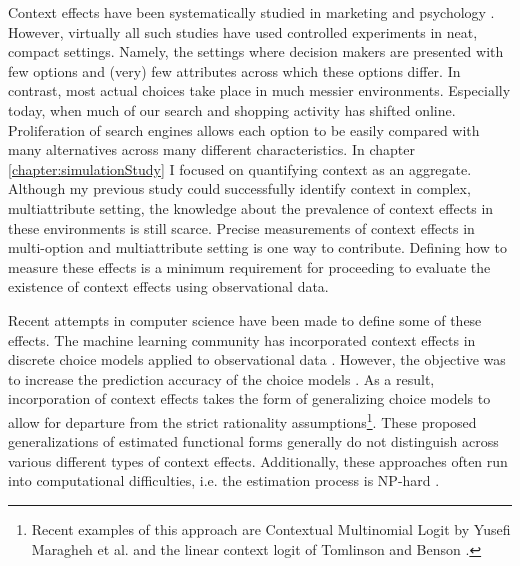 \documentclass[a4paper,12pt]{article}
\newcommand{\citeyearonly}[1]{\citeyearpar{#1}}
\begin{document}
Context effects have been systematically studied in marketing and psychology \citep{kivetz04, roodrkerkEtAl11, frederickEtAl14, dotsonEtAl18}. However, virtually all such studies have used controlled experiments in neat, compact settings. Namely, the settings where decision makers are presented with few options and (very) few attributes across which these options differ. In contrast, most actual choices take place in much messier environments. Especially today, when much of our search and shopping activity has shifted online. Proliferation of search engines allows each option to be easily compared with many alternatives across many different characteristics. In chapter \ref{chapter:simulationStudy} I focused on quantifying context as an aggregate. Although my previous study could successfully identify context in complex, multiattribute setting, the knowledge about the prevalence of context effects in these environments is still scarce. Precise measurements of context effects in multi-option and multiattribute setting is one way to contribute. Defining how to measure these effects is a minimum requirement for proceeding to evaluate the existence of context effects using observational data.

Recent attempts in computer science have been made to define some of these effects. The machine learning community has incorporated context effects in discrete choice models applied to observational data \citep{pfannschmidt2019learning, bowerBalzano20}. However, the objective was to increase the prediction accuracy of the choice models \citep{tomlinsonBenson21}. As a result, incorporation of context effects takes the form of generalizing choice models to allow for departure from the strict rationality assumptions\footnote{Recent examples of this approach are  Contextual Multinomial Logit by Yusefi Maragheh et al. \citeyearonly{yousefi2020choice} and the linear context logit of Tomlinson and Benson \citeyearonly{tomlinsonBenson21}.}. These proposed generalizations of estimated functional forms generally do not distinguish across various different types of context effects. Additionally, these approaches often run into computational difficulties, i.e. the estimation process is NP-hard \citep{yousefi2020choice}.
\end{document}
